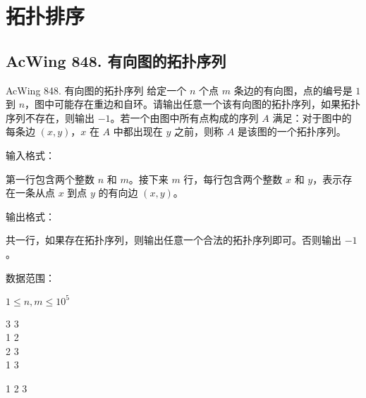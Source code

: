 \section{拓扑排序}

\subsection{AcWing 848. 有向图的拓扑序列}
\begin{titledbox}{AcWing 848. 有向图的拓扑序列}
    给定一个 $n$ 个点 $m$ 条边的有向图，点的编号是 $1$ 到 $n$，图中可能存在重边和自环。请输出任意一个该有向图的拓扑序列，如果拓扑序列不存在，则输出 $-1$。若一个由图中所有点构成的序列 $A$ 满足：对于图中的每条边 $(x, y)$，$x$ 在 $A$ 中都出现在 $y$ 之前，则称 $A$ 是该图的一个拓扑序列。

    输入格式：

    第一行包含两个整数 $n$ 和 $m$。接下来 $m$ 行，每行包含两个整数 $x$ 和 $y$，表示存在一条从点 $x$ 到点 $y$ 的有向边 $(x, y)$。

    输出格式：

    共一行，如果存在拓扑序列，则输出任意一个合法的拓扑序列即可。否则输出 $-1$。

    数据范围：

    $1 \le n,m \le 10^5$

    \begin{inputblock}
        3 3 \\
        1 2 \\
        2 3 \\
        1 3 \\
    \end{inputblock}
    \begin{outputblock}
        1 2 3
    \end{outputblock}
\end{titledbox}

